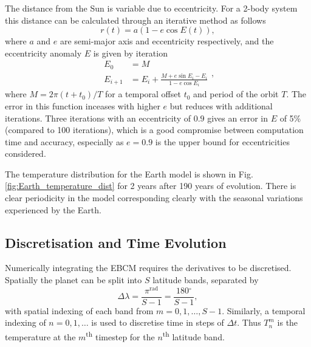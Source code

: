 \documentclass[12pt, onecolumn]{revtex4-2}    %
\newcommand{\radians}{\ensuremath{^{\text{rad}}}}
\newcommand{\degrees}{\ensuremath{^{\circ}}}
\begin{document}
The distance from the Sun is variable due to eccentricity.
For a 2-body system this distance can be calculated through an iterative method as follows
\begin{equation}
  r(t) = a (1 - e \cos E(t)), 
  \label{eq:two_body_distance}
\end{equation}
where $a$ and $e$ are semi-major axis and eccentricity respectively, and the eccentricity anomaly $E$ is given by iteration
\begin{equation}
  \begin{split}
    E_0 &= M \\
    E_{i+1} &= E_i + \frac{M + e \sin E_i - E_i}{1-e \cos E_i}
  \end{split},
  \label{eq:two_body_angle}
\end{equation}
where $M = 2\pi (t + t_0) / T$ for a temporal offset $t_0$ and period of the orbit $T$.
The error in this function inceases with higher $e$ but reduces with additional iterations.
Three iterations with an eccentricity of $0.9$ gives an error in $E$ of 5\% (compared to 100 iterations), which is a good compromise between computation time and accuracy, especially as $e=0.9$ is the upper bound for eccentricities considered.

The temperature distribution for the Earth model is shown in Fig. \ref{fig:Earth_temperature_dist} for 2 years after 190 years of evolution.
There is clear periodicity in the model corresponding clearly with the seasonal variations experienced by the Earth.

\subsection{Discretisation and Time Evolution} \label{ssec:DiscretisationPDE}
%
Numerically integrating the EBCM requires the derivatives to be discretised.
Spatially the planet can be split into $S$ latitude bands, separated by
\begin{equation}
  \Delta\lambda = \frac{\pi\radians}{S-1} = \frac{180\degrees}{S-1},
  \label{eq:latitude_step}
\end{equation}
with spatial indexing of each band from $m=0, 1, \dots, S-1$.
Similarly, a temporal indexing of $n=0, 1, \dots$ is used to discretise time in steps of $\Delta t$.
Thus $T^m_n$ is the temperature at the $m$\textsuperscript{th} timestep for the $n$\textsuperscript{th} latitude band.
\end{document}
